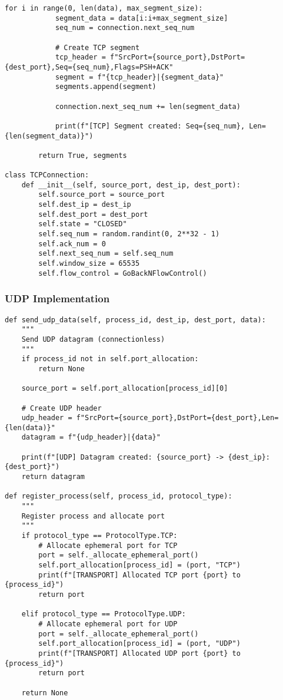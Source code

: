 \documentclass[12pt,a4paper]{article}
\begin{document}
\begin{lstlisting}[caption=TCP Connection Management]
        for i in range(0, len(data), max_segment_size):
            segment_data = data[i:i+max_segment_size]
            seq_num = connection.next_seq_num
            
            # Create TCP segment
            tcp_header = f"SrcPort={source_port},DstPort={dest_port},Seq={seq_num},Flags=PSH+ACK"
            segment = f"{tcp_header}|{segment_data}"
            segments.append(segment)
            
            connection.next_seq_num += len(segment_data)
            
            print(f"[TCP] Segment created: Seq={seq_num}, Len={len(segment_data)}")
        
        return True, segments

class TCPConnection:
    def __init__(self, source_port, dest_ip, dest_port):
        self.source_port = source_port
        self.dest_ip = dest_ip
        self.dest_port = dest_port
        self.state = "CLOSED"
        self.seq_num = random.randint(0, 2**32 - 1)
        self.ack_num = 0
        self.next_seq_num = self.seq_num
        self.window_size = 65535
        self.flow_control = GoBackNFlowControl()
\end{lstlisting}

\subsubsection{UDP Implementation}

\begin{lstlisting}[caption=UDP Datagram Processing]
def send_udp_data(self, process_id, dest_ip, dest_port, data):
    """
    Send UDP datagram (connectionless)
    """
    if process_id not in self.port_allocation:
        return None
    
    source_port = self.port_allocation[process_id][0]
    
    # Create UDP header
    udp_header = f"SrcPort={source_port},DstPort={dest_port},Len={len(data)}"
    datagram = f"{udp_header}|{data}"
    
    print(f"[UDP] Datagram created: {source_port} -> {dest_ip}:{dest_port}")
    return datagram

def register_process(self, process_id, protocol_type):
    """
    Register process and allocate port
    """
    if protocol_type == ProtocolType.TCP:
        # Allocate ephemeral port for TCP
        port = self._allocate_ephemeral_port()
        self.port_allocation[process_id] = (port, "TCP")
        print(f"[TRANSPORT] Allocated TCP port {port} to {process_id}")
        return port
    
    elif protocol_type == ProtocolType.UDP:
        # Allocate ephemeral port for UDP
        port = self._allocate_ephemeral_port()
        self.port_allocation[process_id] = (port, "UDP")
        print(f"[TRANSPORT] Allocated UDP port {port} to {process_id}")
        return port
    
    return None
\end{lstlisting}
\end{document}
